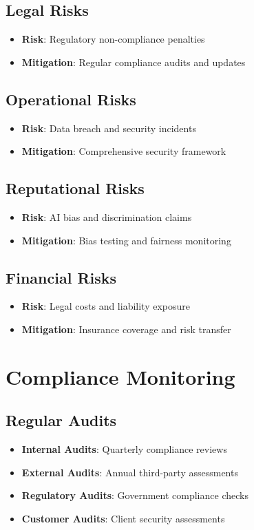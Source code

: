 \documentclass[business]{../templates/infraradar-main}
\begin{document}
\subsection{Legal Risks}
\begin{itemize}
    \item \textbf{Risk}: Regulatory non-compliance penalties
    \item \textbf{Mitigation}: Regular compliance audits and updates
\end{itemize}

\subsection{Operational Risks}
\begin{itemize}
    \item \textbf{Risk}: Data breach and security incidents
    \item \textbf{Mitigation}: Comprehensive security framework
\end{itemize}

\subsection{Reputational Risks}
\begin{itemize}
    \item \textbf{Risk}: AI bias and discrimination claims
    \item \textbf{Mitigation}: Bias testing and fairness monitoring
\end{itemize}

\subsection{Financial Risks}
\begin{itemize}
    \item \textbf{Risk}: Legal costs and liability exposure
    \item \textbf{Mitigation}: Insurance coverage and risk transfer
\end{itemize}

\section{Compliance Monitoring}

\subsection{Regular Audits}
\begin{itemize}
    \item \textbf{Internal Audits}: Quarterly compliance reviews
    \item \textbf{External Audits}: Annual third-party assessments
    \item \textbf{Regulatory Audits}: Government compliance checks
    \item \textbf{Customer Audits}: Client security assessments
\end{itemize}
\end{document}
